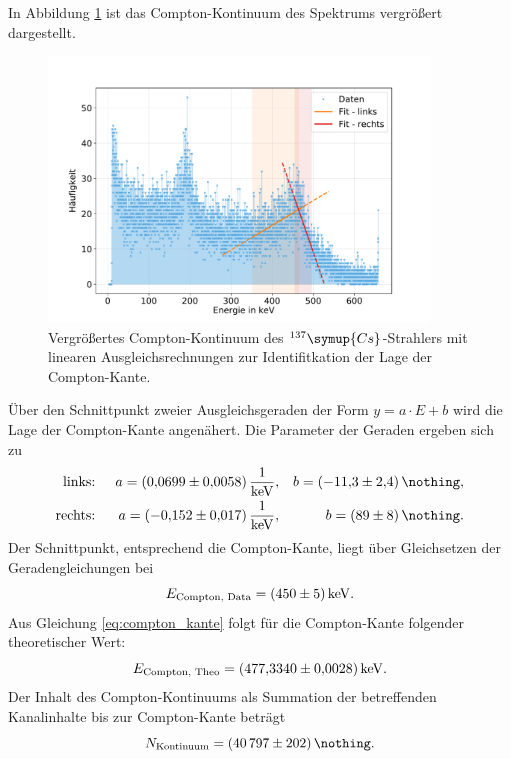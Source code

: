 In Abbildung \ref{fig:cs_kontinuum} ist das Compton-Kontinuum des Spektrums vergrößert dargestellt.
\begin{figure}[h!]
  \centering
  \includegraphics[width=0.9\textwidth]{content/images/caesium_kontinuum.pdf}
  \caption{Vergrößertes Compton-Kontinuum des $^{137}\symup{Cs}$-Strahlers mit linearen Ausgleichsrechnungen zur Identifitkation der Lage der Compton-Kante.}
  \label{fig:cs_kontinuum}
\end{figure}
Über den Schnittpunkt zweier Ausgleichsgeraden der Form $y = a \cdot E + b$ wird die Lage der Compton-Kante angenähert.
Die Parameter der Geraden ergeben sich zu
\begin{align*}
	\text{links: }  && a = \SI{0.0699 (58)}{\frac{1}{\kilo \electronvolt}}, && b = \SI{-11.3 (24)}{\nothing}, \\
	\text{rechts: } && a = \SI{-0.152 (17)}{\frac{1}{\kilo \electronvolt}}, && b = \SI{ 89 (8)}{\nothing}. \\
\end{align*}
Der Schnittpunkt, entsprechend die Compton-Kante, liegt über Gleichsetzen der Geradengleichungen bei
\begin{equation*}
	E_{\text{Compton, Data}} = \SI{450 (5)}{\kilo \electronvolt}.
\end{equation*}
Aus Gleichung \eqref{eq:compton_kante} folgt für die Compton-Kante folgender theoretischer Wert:
\begin{equation*}
	E_{\text{Compton, Theo}} = \SI{477.3340 (28)}{\kilo \electronvolt}.
\end{equation*}
Der Inhalt des Compton-Kontinuums als Summation der betreffenden Kanalinhalte bis zur Compton-Kante beträgt
\begin{equation*}
	N_{\text{Kontinuum}} = \SI{40797 (202)}{\nothing}. %
\end{equation*}
\FloatBarrier

